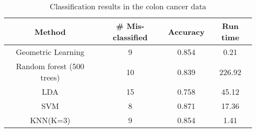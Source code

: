 \documentclass[twoside]{article}
\begin{document}
\begin{table*}[b]
\begin{center}
\begin{tabular} {| c | c  c  c|} \hline
Method & \# Mis-classified & Accuracy & Run time \\ \hline
Geometric Learning & 9 & 0.854 & 0.21 \\
Random forest (500 trees) & 10 & 0.839 & 226.92\\
LDA & 15 & 0.758 & 45.12\\
SVM & 8 & 0.871 & 17.36\\ 
KNN(K=3) & 9 & 0.854 & 1.41\\ \hline
\end{tabular}
\end{center}
\caption{Classification results in the colon cancer data}
\label{table:ColonTable}
\end{table*}



\end{document}
